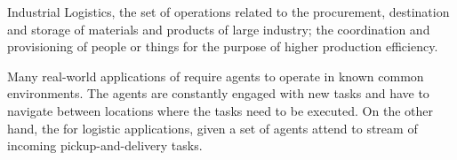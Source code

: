 \begin{mydef}
    Industrial Logistics, the set of operations related to the procurement,
    destination and storage of materials and products of large industry; the coordination and provisioning of people or things for the purpose of higher production efficiency.
\end{mydef}

Many real-world applications of \mrs require agents to operate
in known common environments. The agents are constantly engaged with new tasks and have
to navigate between locations where the tasks need to be executed. On the other hand,
the \mrs for logistic applications, given a set of agents attend 
to stream of incoming pickup-and-delivery tasks.